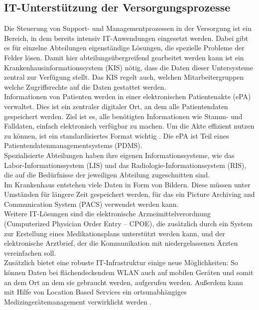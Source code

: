 \subsection{IT-Unterstützung der Versorgungsprozesse}
Die Steuerung von Support- und Managementprozessen in der Versorgung ist ein Bereich, in dem bereits intensiv IT-Anwendungen eingesetzt werden. Dabei gibt es für einzelne Abteilungen eigenständige Lösungen, die spezielle Probleme der Felder lösen. Damit hier abteilungsübergreifend gearbeitet werden kann ist ein Krankenhausinformationssystem (KIS) nötig, dass die Daten dieser Untersysteme zentral zur Verfügung stellt. Das KIS regelt auch, welchen Mitarbeitergruppen welche Zugriffsrechte auf die Daten gestattet werden.\\

Informationen von Patienten werden in einer elektronischen Patientenakte (ePA) verwaltet. Dies ist ein zentraler digitaler Ort, an dem alle Patientendaten gespeichert werden. Ziel ist es, alle benötigten Informationen wie Stamm- und Falldaten, einfach elektronisch verfügbar zu machen. Um die Akte effizient nutzen zu können, ist ein standardisiertes Format wichtig \parencite{oswald2019}. Die ePA ist Teil eines Patientendatenmanagementsystems (PDMS).\\

Spezialisierte Abteilungen haben ihre eigenen Informationssysteme, wie das Labor-Informationssystem (LIS) und das Radiologie-Informationssystem (RIS), die auf die Bedürfnisse der jeweiligen Abteilung zugeschnitten sind.\\

Im Krankenhaus entstehen viele Daten in Form von Bildern. Diese müssen unter Umständen für längere Zeit gespeichert werden, für das ein Picture Archiving and Communication System (PACS) verwendet werden kann.\\

Weitere IT-Lösungen sind die elektronische Arzneimittelverordnung (Cumputerized Physician Order Entry -- CPOE), die zusätzlich durch ein System zur Erstellung eines Medikationsplans unterstützt werden kann, und der elektronische Arztbrief, der die Kommunikation mit niedergelassenen Ärzten vereinfachen soll. \parencite{braeutigam2017}\\

Zusätzlich bietet eine robuste IT-Infrastruktur einige neue Möglichkeiten: So können Daten bei flächendeckendem WLAN auch auf mobilen Geräten und somit an dem Ort an dem sie gebraucht werden, aufgerufen werden. Außerdem kann mit Hilfe von Location Based Services ein ortsunabhängiges Medizingerätemanagement verwirklicht werden \parencite{mci/Leimeister2006}.

